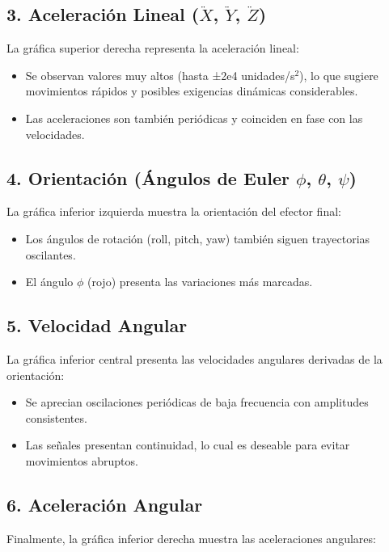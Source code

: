 \subsection*{3. Aceleración Lineal ($\ddot{X}$, $\ddot{Y}$, $\ddot{Z}$)} La gráfica superior derecha representa la aceleración lineal:

\begin{itemize}
	\item Se observan valores muy altos (hasta ±2e4 unidades/s$^2$), lo que sugiere movimientos rápidos y posibles exigencias dinámicas considerables.
	\item Las aceleraciones son también periódicas y coinciden en fase con las velocidades.
\end{itemize}


\subsection*{4. Orientación (Ángulos de Euler $\phi$, $\theta$, $\psi$)} La gráfica inferior izquierda muestra la orientación del efector final:

\begin{itemize}
	\item Los ángulos de rotación (roll, pitch, yaw) también siguen trayectorias oscilantes.
	\item El ángulo $\phi$ (rojo) presenta las variaciones más marcadas.
\end{itemize}


\subsection*{5. Velocidad Angular}
La gráfica inferior central presenta las velocidades angulares derivadas de la orientación:


\begin{itemize}
	\item Se aprecian oscilaciones periódicas de baja frecuencia con amplitudes consistentes.
	\item Las señales presentan continuidad, lo cual es deseable para evitar movimientos abruptos.
\end{itemize}


\subsection*{6. Aceleración Angular}
Finalmente, la gráfica inferior derecha muestra las aceleraciones angulares:

